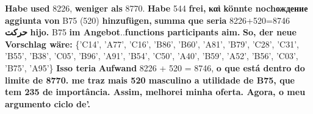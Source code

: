 \documentclass{article}
\newcommand{\car}[1]{\textbf{\textcolor{Arabic}{\textarabic{#1}}}}
\newcommand{\cen}[1]{\textbf{\textcolor{English}{#1}}}
\newcommand{\cde}[1]{\textbf{\textcolor{German}{#1}}}
\newcommand{\czh}[1]{\textbf{\textcolor{Chinese}{\textchinese{#1}}}}
\newcommand{\cru}[1]{\textbf{\textcolor{Russian}{\textrussian{#1}}}}
\newcommand{\cgr}[1]{\textbf{\textcolor{Greek}{\textgreek{#1}}}}
\newcommand{\cit}[1]{\textbf{\textcolor{Italian}{#1}}}
\newcommand{\ces}[1]{\textbf{\textcolor{Spanish}{#1}}}
\newcommand{\cpt}[1]{\textbf{\textcolor{Portuguese}{#1}}}
\begin{document}
\raggedright

\color{Neutral}
\cde{Habe} \cen{used} 8226, \cde{weniger als} 8770. \cde{Habe} 544 \cde{frei,} \cgr{καὶ} \cde{könnte noch}\cru{ождение} \cit{aggiunta} \cde{von} B75 (520) \cde{hinzufügen,} \cpt{summa que seria} 8226+520=8746 \car{حرکت} \ces{hijo.} \czh{包括} B75 \cde{im Angebot}..\cen{functions participants aim.} \cde{So, der neue Vorschlag wäre:} \{'C14', 'A77', 'C16', 'B86', 'B60', 'A81', 'B79', 'C28', 'C31', 'B55', 'B38', 'C05', 'B96', 'A91', 'B54', 'C50', 'A40', 'B59', 'A52', 'B56', 'C03', 'B75', 'A95'\} \cpt{Isso teria} \cde{Aufwand} 8226 + 520 = 8746, \cpt{o que está dentro do limite de 8770. me traz mais 520 masculino a utilidade de B75, que tem 235 de importância. Assim, melhorei minha oferta. Agora, o meu argumento ciclo de'.}
\end{document}
